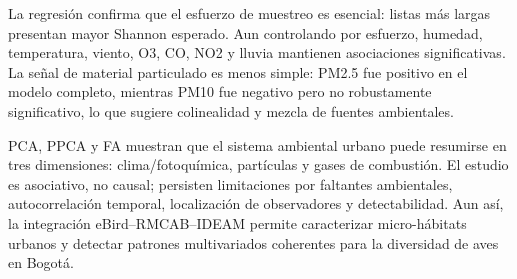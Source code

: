 \documentclass[9pt,letterpaper]{article}
\begin{document}
La regresión confirma que el esfuerzo de muestreo es esencial: listas más largas presentan mayor Shannon esperado. Aun controlando por esfuerzo, humedad, temperatura, viento, O3, CO, NO2 y lluvia mantienen asociaciones significativas. La señal de material particulado es menos simple: PM2.5 fue positivo en el modelo completo, mientras PM10 fue negativo pero no robustamente significativo, lo que sugiere colinealidad y mezcla de fuentes ambientales.

PCA, PPCA y FA muestran que el sistema ambiental urbano puede resumirse en tres dimensiones: clima/fotoquímica, partículas y gases de combustión. El estudio es asociativo, no causal; persisten limitaciones por faltantes ambientales, autocorrelación temporal, localización de observadores y detectabilidad. Aun así, la integración eBird--RMCAB--IDEAM permite caracterizar micro-hábitats urbanos y detectar patrones multivariados coherentes para la diversidad de aves en Bogotá.
\end{document}
